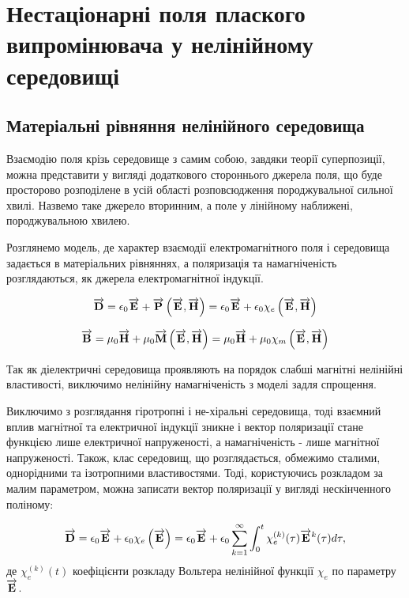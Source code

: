 \chapter{Нестаціонарні поля плаского випромінювача у нелінійному середовищі}
\label{ch:nonlinear}

\section{Матеріальні рівняння нелінійного середовища}

Взаємодію поля крізь середовище з самим собою, завдяки теорії суперпозиції,
можна представити у вигляді додаткового стороннього джерела поля, що буде
просторово розподілене в усій області розповсюдження породжувальної
сильної хвилі. Назвемо таке джерело вторинним, а поле у лінійному наближені,
породжувальною хвилею.

Розглянемо модель, де характер взаємодії електромагнітного поля і середовища 
задається в матеріальних рівняннях, а поляризація та намагніченість 
розглядаються, як джерела електромагнітної індукції.

\begin{equation*}
\overrightarrow{\mathbf D} = \epsilon_0 \overrightarrow{\mathbf E} + \overrightarrow{\mathbf P} \left( \overrightarrow{\mathbf E}, \overrightarrow{\mathbf H} \right) =
\epsilon_0 \overrightarrow{\mathbf E} + \epsilon_0 \chi_e \left( \overrightarrow{\mathbf E}, \overrightarrow{\mathbf H} \right)
\end{equation*}

\begin{equation*}
\overrightarrow{\mathbf B} = \mu_0 \overrightarrow{\mathbf H} + \mu_0 \overrightarrow{\mathbf M} \left( \overrightarrow{\mathbf E}, \overrightarrow{\mathbf H} \right) =
\mu_0 \overrightarrow{\mathbf H} + \mu_0 \chi_m \left( \overrightarrow{\mathbf E}, \overrightarrow{\mathbf H} \right)
\end{equation*}

Так як діелектричні середовища проявляють на порядок слабші магнітні
нелінійні властивості, виключимо нелінійну намагніченість з моделі задля
спрощення.

Виключимо з розглядання гіротропні і не-хіральні середовища, тоді взаємний 
вплив магнітної та електричної індукції зникне і вектор поляризації стане 
функцією лише електричної напруженості, а намагніченість - лише магнітної
напруженості. Також, клас середовищ, що розглядається, обмежимо сталими, 
однорідними та ізотропними властивостями. Тоді, користуючись розкладом за 
малим параметром, можна записати вектор поляризації у вигляді нескінченного 
поліному:

\begin{equation} \label{eq:d_voltera}
\overrightarrow{\mathbf D} = \epsilon_0 \overrightarrow{\mathbf E} + \epsilon_0 \chi_e \left( \overrightarrow{\mathbf E} \right) = 
\epsilon_0 \overrightarrow{\mathbf E} + \epsilon_0 \sum_{k=1}^{\infty} \int_0^t
\chi_e^{(k)} (\tau) \overrightarrow{\mathbf E}^k (\tau) d \tau,
\end{equation}
%
де $\chi_e^{(k)} (t) $ коефіцієнти розкладу Вольтера нелінійної функції 
$ \chi_e $ по параметру $ \overrightarrow{\mathbf E} $.


